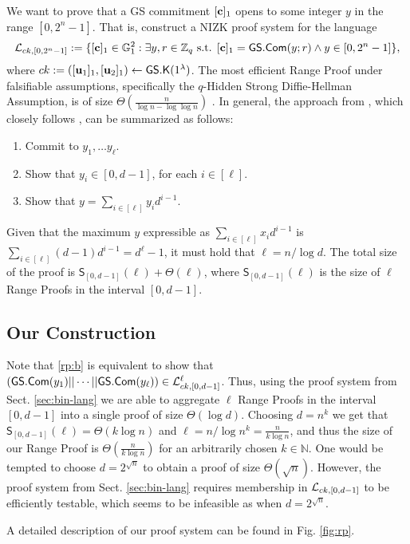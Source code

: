 We want to prove that a GS commitment $[\mathbf{c}]_1$ opens to some integer $y$ in the range $[0,2^n-1]$. That is, construct a NIZK proof system for the language
$$
\mathcal{L}_{ck,[0,2^n-1]} := \{[\mathbf{c}]_1\in\mathbb{G}_1^2: \exists y,r\in\mathbb{Z}_q\text{ s.t. }[\mathbf{c}]_1={\mathsf{GS}}.\mathsf{Com}(y;r)\wedge y\in[0,2^n-1]\},
$$
where $ck:=([\mathbf{u}_1]_1,[\mathbf{u}_2]_1)\gets{\mathsf{GS}}.\mathsf{K}(1^\lambda)$.
The most efficient Range Proof under falsifiable assumptions, specifically the $q$-Hidden Strong Diffie-Hellman Assumption, is of size $\Theta(\frac{n}{\log n-\log\log n})$ \cite{PAIRING:RiaKohPre09}.
In general, the approach from \cite{PAIRING:RiaKohPre09}, which closely follows \cite{AC:CamChaShe08}, can be summarized as follows:

\begin{enumerate}[label=\alph*)]
\item Commit to $y_1,\ldots y_\ell$.
\item Show that $y_i\in[0,d-1]$, for each $i\in[\ell]$. \label{rp:b}
\item Show that $y=\sum_{i\in[\ell]}y_id^{i-1}$.
\end{enumerate}

Given that the maximum $y$ expressible as $\sum_{i\in[\ell]}x_id^{i-1}$ is $\sum_{i\in[\ell]}(d-1)d^{i-1}=d^\ell-1$, it must hold that $\ell=n/\log d$. The total size of the proof is $\mathsf{S}_{[0,d-1]}(\ell)+\Theta(\ell)$, where $\mathsf{S}_{[0,d-1]}(\ell)$ is the size of $\ell$ Range Proofs in the interval $[0,d-1]$.

\subsection{Our Construction}
Note that \ref{rp:b} is equivalent to show that $({\mathsf{GS}}.\mathsf{Com}(y_1)||\cdots||{\mathsf{GS}}.\mathsf{Com}(y_\ell))\in\mathcal{L}_{ck,[0,d-1]}^\ell$. Thus, using the proof system from Sect. \ref{sec:bin-lang} we are able to aggregate $\ell$ Range Proofs in the interval $[0,d-1]$ into a single proof of size $\Theta(\log d)$. Choosing $d=n^k$ we get that $\mathsf{S}_{[0,d-1]}(\ell)=\Theta(k\log n)$ and $\ell=n/\log n^k=\frac{n}{k\log n}$, and thus the size of our Range Proof is $\Theta(\frac{n}{k\log n})$ for an arbitrarily chosen $k\in\mathbb{N}$. One would be tempted to choose $d=2^{\sqrt{n}}$ to obtain a proof of size $\Theta(\sqrt{n})$. However, the proof system from Sect. \ref{sec:bin-lang} requires membership in $\mathcal{L}_{ck,[0,d-1]}$ to be efficiently testable, which seems to be infeasible as when $d=2^{\sqrt{n}}$.

A detailed description of our proof system can be found in Fig. \ref{fig:rp}.


